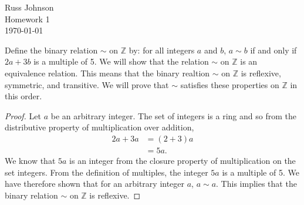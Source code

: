 \documentclass[12pt]{article}
\begin{document}
\begin{flushright}
Russ Johnson\\
Homework 1\\
\today\\
\end{flushright}
Define the binary relation $\sim$ on $\mathbb{Z}$ by: for all integers $a$ and $b$, $a\sim b$ if and only if $2a+3b$ is a multiple of 5. We will show that the relation $\sim$ on $\mathbb{Z}$ is an equivalence relation. This means that the binary realtion $\sim$ on $\mathbb{Z}$ is reflexive, symmetric, and transitive. We will prove that $\sim$ satisfies these properties on $\mathbb{Z}$ in this order.

\begin{proof}
Let $a$ be an arbitrary integer. The set of integers is a ring and so from the distributive property of multiplication over addition,
\begin{align*}
2a+3a &= (2+3)a \\
&= 5a.
\end{align*}
We know that $5a$ is an integer from the closure property of multiplication on the set integers. From the definition of multiples, the integer $5a$ is a multiple of 5. We have therefore shown that for an arbitrary integer $a$, $a\sim a$. This implies that the binary relation $\sim$ on $\mathbb{Z}$ is reflexive.
\end{proof}
\end{document}
